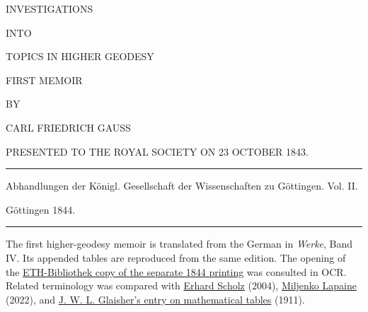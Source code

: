 \clearpage
{}
\thispagestyle{empty}
\vspace*{.3in}
\begin{center}
{\large INVESTIGATIONS}\par\bigskip
INTO\par\bigskip
{\Large TOPICS IN HIGHER GEODESY}\par\vspace{25pt}
FIRST MEMOIR\par\vspace{35pt}
BY\par\vspace{35pt}
{\large CARL FRIEDRICH GAUSS}\par\vspace{35pt}
{\small PRESENTED TO THE ROYAL SOCIETY ON 23 OCTOBER 1843.}
\end{center}
\vfill
\begin{center}
\rule{.8\linewidth}{.3pt}\par\smallskip
Abhandlungen der Königl. Gesellschaft der Wissenschaften zu Göttingen. Vol. II.\par
Göttingen 1844.\par\smallskip
\rule{.8\linewidth}{.3pt}
\end{center}
\par\bigskip\begingroup\fontsize{9}{11}\selectfont\raggedright\noindent The first higher-geodesy memoir is translated from the German in \textit{Werke}, Band IV. Its appended tables are reproduced from the same edition. The opening of the \href{https://doi.org/10.3931/e-rara-2860}{ETH-Bibliothek copy of the separate 1844 printing} was consulted in OCR. Related terminology was compared with \href{https://arxiv.org/abs/math/0409578}{Erhard Scholz} (2004), \href{https://doi.org/10.12902/zfv-0387-2022}{Miljenko Lapaine} (2022), and \href{https://en.wikisource.org/w/index.php?oldid=12858814}{J. W. L. Glaisher's entry on mathematical tables} (1911).\par\endgroup
\clearpage
